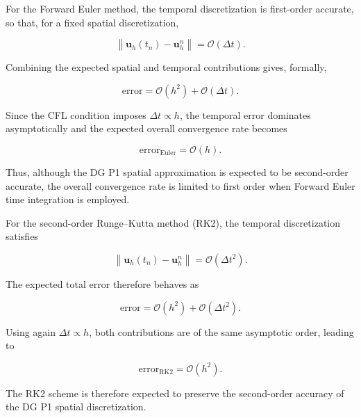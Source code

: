 \documentclass[11pt,a4paper]{report}
\theoremstyle{plain}
\theoremstyle{definition}
\begin{document}
For the Forward Euler method, the temporal discretization is first-order
accurate, so that, for a fixed spatial discretization,

\begin{equation}
\left\|
\mathbf{u}_h(t_n)-\mathbf{u}_h^n
\right\|
=
\mathcal{O}(\Delta t).
\end{equation}

Combining the expected spatial and temporal contributions gives, formally,

\begin{equation}
\text{error}
=
\mathcal{O}(h^2)
+
\mathcal{O}(\Delta t).
\end{equation}

Since the CFL condition imposes \(\Delta t \propto h\), the temporal error
dominates asymptotically and the expected overall convergence rate becomes

\begin{equation}
\boxed{
\text{error}_{\mathrm{Euler}}
=
\mathcal{O}(h).
}
\end{equation}

Thus, although the DG P1 spatial approximation is expected to be second-order
accurate, the overall convergence rate is limited to first order when Forward
Euler time integration is employed.

For the second-order Runge--Kutta method (RK2), the temporal discretization
satisfies

\begin{equation}
\left\|
\mathbf{u}_h(t_n)-\mathbf{u}_h^n
\right\|
=
\mathcal{O}(\Delta t^2).
\end{equation}

The expected total error therefore behaves as

\begin{equation}
\text{error}
=
\mathcal{O}(h^2)
+
\mathcal{O}(\Delta t^2).
\end{equation}

Using again \(\Delta t \propto h\), both contributions are of the same
asymptotic order, leading to

\begin{equation}
\boxed{
\text{error}_{\mathrm{RK2}}
=
\mathcal{O}(h^2).
}
\end{equation}

The RK2 scheme is therefore expected to preserve the second-order accuracy of
the DG P1 spatial discretization.

\end{document}

